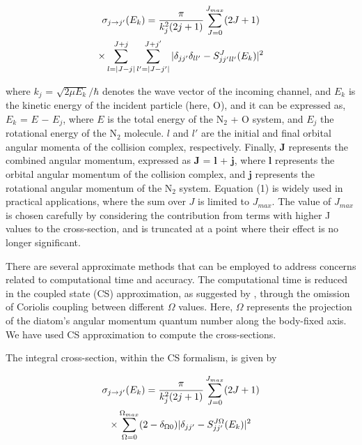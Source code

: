 \documentclass[fleqn,usenatbib]{mnras}
\begin{document}
\begin{multline}{\label{eq01}}
\sigma_{j\rightarrow j'}(E_k) = \frac{\pi}{k_{j}^2(2j+1)}\sum_{J=0}^{J_{max}}(2J+1) \\
 \times \sum_{l=|J-j|}^{J+j} \sum_{l'=|J-j'|}^{J+j'}
 |\delta_{jj'} \delta_{ll'} - S_{jj'll'}^{J}(E_k)|^2
\end{multline}

where $k_{j}$ = $\sqrt{2\mu E_{k}}/{\hbar}$ denotes the wave vector of the incoming channel, and $E_k$ is the kinetic energy of the incident particle (here, O), and it can be expressed as, $E_k$ = $E$ $-$ $E_j$, where $E$ is the total energy of the N$_2$ + O system, and $E_j$ the rotational energy of the N$_2$ molecule. $l$ and $l'$ are the initial and final orbital angular momenta of the collision complex, respectively. Finally, $\textbf{J}$ represents the combined angular momentum, expressed as $\textbf{J}$ = $\textbf{l}$ + $\textbf{j}$, where $\textbf{l}$ represents the orbital angular momentum of the collision complex, and $\textbf{j}$ represents the rotational angular momentum of the N$_2$ system. Equation (1) is widely used in practical applications, where the sum over $J$ is limited to $J_{max}$. The value of $J_{max}$ is chosen carefully by considering the contribution from terms with higher J values to the cross-section, and is truncated at a point where their effect is no longer significant.

There are several approximate methods that can be employed to address concerns related to computational time and accuracy. The computational time is reduced in the coupled state (CS) approximation, as suggested by \cite{doi:10.1063/1.1681388}, through the omission of Coriolis coupling between different $\Omega$ values. Here, $\Omega$ represents the projection of the diatom's angular momentum quantum number along the body-fixed axis. We have used CS approximation to compute the cross-sections.


The integral cross-section, within the CS formalism, is given by

\begin{multline}{\label{eq02}}
\sigma_{j\rightarrow j'}(E_k) = \frac{\pi}{k_{j}^2(2j+1)} \sum_{J=0}^{J_{max}}(2J+1)\\
 \times \sum_{\Omega=0}^{\Omega_{max}}(2-\delta_{\Omega 0})
 |\delta_{jj'} - S_{jj'}^{J \Omega}(E_k)|^2
\end{multline}
\end{document}

